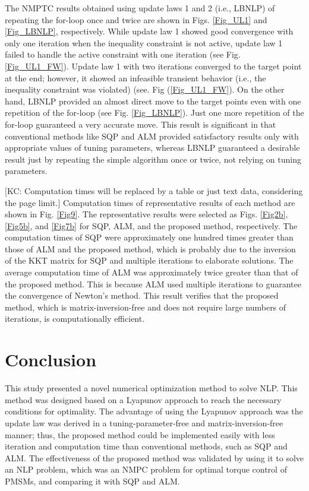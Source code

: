 \documentclass[journal]{IEEEtranTIE}
\newcommand{\KYCH}[1]{{\color{blue} [KC: #1]}} %
\begin{document}
The NMPTC results obtained using update laws 1 and 2 (i.e., LBNLP) of repeating the for-loop once and twice are shown in Figs. \ref{Fig_UL1} and \ref{Fig_LBNLP}, respectively. While update law 1 showed good convergence with only one iteration when the inequality constraint is not active, update law 1 failed to handle the active constraint with one iteration (see Fig. \ref{Fig_UL1_FW}). Update law 1 with two iterations converged to the target point at the end; however, it showed an infeasible transient behavior (i.e., the inequality constraint was violated) (see. Fig (\ref{Fig_UL1_FW}). On the other hand, LBNLP provided an almost direct move to the target points even with one repetition of the for-loop (see Fig. \ref{Fig_LBNLP}). Just one more repetition of the for-loop guaranteed a very accurate move. This result is significant in that conventional methods like SQP and ALM provided satisfactory results only with appropriate values of tuning parameters, 
whereas LBNLP guaranteed a desirable result just by repeating the simple algorithm once or twice, not relying on tuning parameters.

\KYCH{Computation times will be replaced by a table or just text data, considering the page limit.}
Computation times of representative results of each method are shown in Fig. \ref{Fig9}. The representative results were selected as Figs. \ref{Fig2b}, \ref{Fig5b}, and \ref{Fig7b} for SQP, ALM, and the proposed method, respectively. The computation times of SQP were approximately one hundred times greater than those of ALM and the proposed method, which is probably due to the inversion of the KKT matrix for SQP and multiple iterations to elaborate solutions. The average computation time of ALM was approximately twice greater than that of the proposed method. This is because ALM used multiple iterations to guarantee the convergence of Newton's method. This result verifies that the proposed method, which is matrix-inversion-free and does not require large numbers of iterations, is computationally efficient.


\section{Conclusion}

This study presented a novel numerical optimization method to solve NLP. This method was designed based on a Lyapunov approach to reach the necessary conditions for optimality. The advantage of using the Lyapunov approach was the update law was derived in a tuning-parameter-free and matrix-inversion-free manner; thus, the proposed method could be implemented easily with less iteration and computation time than conventional methods, such as SQP and ALM. The effectiveness of the proposed method was validated by using it to solve an NLP problem, which was an NMPC problem for optimal torque control of PMSMs, and comparing it with SQP and ALM.
\end{document}
